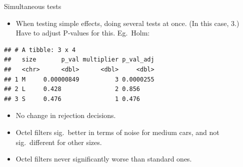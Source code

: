 \documentclass[
  ignorenonframetext,
]{beamer}
\newenvironment{Shaded}{\begin{snugshade}}{\end{snugshade}}
\newcommand{\DataTypeTok}[1]{\textcolor[rgb]{0.13,0.29,0.53}{#1}}
\newcommand{\DecValTok}[1]{\textcolor[rgb]{0.00,0.00,0.81}{#1}}
\newcommand{\KeywordTok}[1]{\textcolor[rgb]{0.13,0.29,0.53}{\textbf{#1}}}
\newcommand{\NormalTok}[1]{#1}
\newcommand{\OperatorTok}[1]{\textcolor[rgb]{0.81,0.36,0.00}{\textbf{#1}}}
\newcommand{\StringTok}[1]{\textcolor[rgb]{0.31,0.60,0.02}{#1}}
\providecommand{\tightlist}{%
  \setlength{\itemsep}{0pt}\setlength{\parskip}{0pt}}
\begin{document}
\begin{frame}[fragile]{Simultaneous tests}
\protect\hypertarget{simultaneous-tests}{}

\begin{itemize}
\tightlist
\item
  When testing simple effects, doing several tests at once. (In this
  case, 3.) Have to adjust P-values for this. Eg.~Holm:
\end{itemize}

\footnotesize

\begin{Shaded}
\end{Shaded}

\begin{verbatim}
## # A tibble: 3 x 4
##   size       p_val multiplier p_val_adj
##   <chr>      <dbl>      <dbl>     <dbl>
## 1 M     0.00000849          3 0.0000255
## 2 L     0.428               2 0.856    
## 3 S     0.476               1 0.476
\end{verbatim}

\normalsize

\footnotesize

\begin{itemize}
\item
  No change in rejection decisions.
\item
  Octel filters sig.~better in terms of noise for medium cars, and not
  sig.~different for other sizes.
\item
  Octel filters never significantly worse than standard ones.
\end{itemize}

\normalsize

\end{frame}
\end{document}
